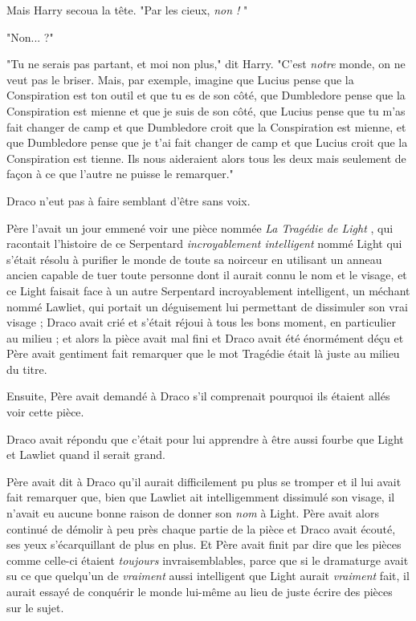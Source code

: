 Mais Harry secoua la tête. "Par les cieux, \emph{non !} "

"Non... ?"

"Tu ne serais pas partant, et moi non plus," dit Harry. "C'est \emph{notre}  monde, on ne veut pas le briser. Mais, par exemple, imagine que Lucius pense que la Conspiration est ton outil et que tu es de son côté, que Dumbledore pense que la Conspiration est mienne et que je suis de son côté, que Lucius pense que tu m'as fait changer de camp et que Dumbledore croit que la Conspiration est mienne, et que Dumbledore pense que je t'ai fait changer de camp et que Lucius croit que la Conspiration est tienne. Ils nous aideraient alors tous les deux mais seulement de façon à ce que l'autre ne puisse le remarquer."

Draco n'eut pas à faire semblant d'être sans voix.

Père l'avait un jour emmené voir une pièce nommée \emph{La Tragédie de Light} , qui racontait l'histoire de ce Serpentard \emph{incroyablement intelligent}  nommé Light qui s'était résolu à purifier le monde de toute sa noirceur en utilisant un anneau ancien capable de tuer toute personne dont il aurait connu le nom et le visage, et ce Light faisait face à un autre Serpentard incroyablement intelligent, un méchant nommé Lawliet, qui portait un déguisement lui permettant de dissimuler son vrai visage ; Draco avait crié et s'était réjoui à tous les bons moment, en particulier au milieu ; et alors la pièce avait mal fini et Draco avait été énormément déçu et Père avait gentiment fait remarquer que le mot Tragédie était là juste au milieu du titre.

Ensuite, Père avait demandé à Draco s'il comprenait pourquoi ils étaient allés voir cette pièce.

Draco avait répondu que c'était pour lui apprendre à être aussi fourbe que Light et Lawliet quand il serait grand.

Père avait dit à Draco qu'il aurait difficilement pu plus se tromper et il lui avait fait remarquer que, bien que Lawliet ait intelligemment dissimulé son visage, il n'avait eu aucune bonne raison de donner son \emph{nom}  à Light. Père avait alors continué de démolir à peu près chaque partie de la pièce et Draco avait écouté, ses yeux s'écarquillant de plus en plus. Et Père avait finit par dire que les pièces comme celle-ci étaient \emph{toujours}  invraisemblables, parce que si le dramaturge avait su ce que quelqu'un de \emph{vraiment}  aussi intelligent que Light aurait \emph{vraiment } fait, il aurait essayé de conquérir le monde lui-même au lieu de juste écrire des pièces sur le sujet.

